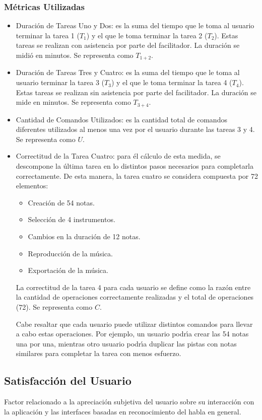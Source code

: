 \subsubsection{M\'etricas Utilizadas}
\begin{itemize}
	\item Duraci\'on de Tareas Uno y Dos: es la suma del tiempo que le toma al usuario
	terminar la tarea 1 ($T_1$) y el que le toma terminar la tarea 2 ($T_2$). 
	Estas tareas se realizan con asistencia por parte del facilitador. 
	La duraci\'on se midi\'o en minutos. Se representa como $T_{1+2}$.
	\item Duraci\'on de Tareas Tres y Cuatro: es la suma del tiempo que le toma al usuario
	terminar la tarea 3 ($T_3$) y el que le toma terminar la tarea 4 ($T_4$). 
	Estas tareas se realizan sin asistencia por parte del facilitador. 
	La duraci\'on se mide en minutos. Se representa como $T_{3+4}$.
	\item Cantidad de Comandos Utilizados: es la cantidad total de comandos diferentes utilizados
	al menos una vez por el usuario durante las tareas 3 y 4. Se representa como $U$.
	\item Correctitud de la Tarea Cuatro: para \'el c\'alculo de esta medida, se descompone la
	\'ultima tarea en lo distintos pasos necesarios para completarla correctamente.
	De esta manera, la tarea cuatro se considera compuesta por 72 elementos:
	\begin{itemize}
		\item Creaci\'on de 54 notas.
		\item Selecci\'on de 4 instrumentos.
		\item Cambios en la duraci\'on de 12 notas.
		\item Reproducci\'on de la m\'usica.
		\item Exportaci\'on de la m\'usica.
	\end{itemize}
	La correctitud de la tarea 4 para cada usuario se define como la raz\'on entre la cantidad de operaciones
	correctamente realizadas y el total de operaciones (72). Se representa como $C$.

	Cabe resaltar que cada usuario puede utilizar distintos comandos para llevar a cabo estas operaciones.
	Por ejemplo, un usuario podr{\'\i}a crear las 54 notas una por una, mientras otro usuario podr{\'\i}a
	duplicar las pistas con notas similares para completar la tarea con menos esfuerzo.

\end{itemize}

\subsection{Satisfacci\'on del Usuario}
Factor relacionado a la apreciaci\'on subjetiva del usuario sobre su interacci\'on con la aplicaci\'on y
las interfaces basadas en reconocimiento del habla en general.
